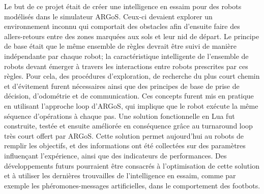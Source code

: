 Le but de ce projet était de créer une intelligence en essaim pour des robots modélisés dans le simulateur ARGoS. Ceux-ci devaient explorer un environnement inconnu qui comportait des obstacles afin d'ensuite faire des allers-retours entre des zones marquées aux sols et leur nid de départ. Le principe de base était que le même ensemble de règles devrait être suivi de manière indépendante par chaque robot; la caractéristique intelligente de l'ensemble de robots devant émerger à travers les interactions entre robots prescrites par ces règles. Pour cela, des procédures d'exploration, de recherche du plus court chemin et d'évitement furent nécessaires ainsi que des principes de base de prise de décision, d'odométrie et de communication. Ces concepts furent mis en pratique en utilisant l'approche loop d'ARGoS, qui implique que le robot exécute la même séquence d'opérations à chaque pas. Une solution fonctionnelle en Lua fut construite, testée et ensuite améliorée en conséquence grâce au turnaround loop très court offert par ARGoS. Cette solution permet aujourd'hui au robots de remplir les objectifs, et des informations ont été collectées sur des paramètres influençant l'expérience, ainsi que des indicateurs de performances. Des développements futurs pourraient être consacrés à l'optimisation de cette solution et à utiliser les dernières trouvailles de l'intelligence en essaim, comme par exemple les phéromones-messages artificielles, dans le comportement des footbots.
